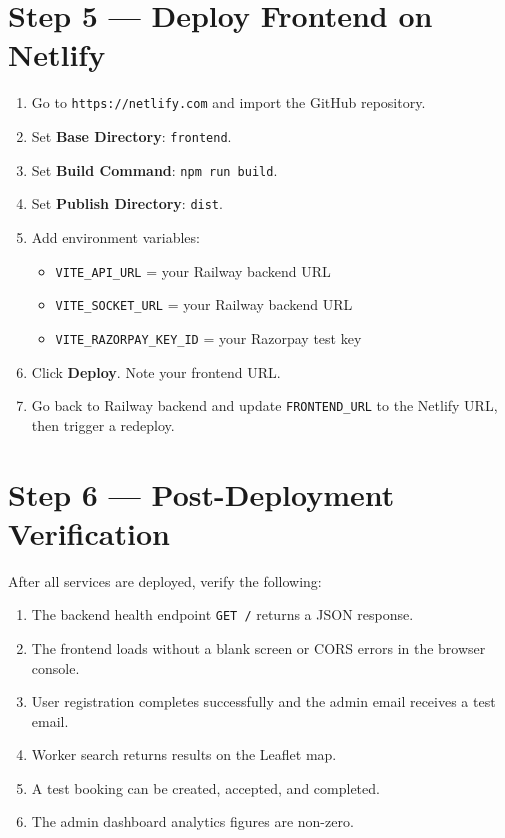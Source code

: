 \documentclass[12pt,a4paper]{report}
\begin{document}
\section{Step 5 — Deploy Frontend on Netlify}

\begin{enumerate}[leftmargin=*]
\item Go to \texttt{https://netlify.com} and import the GitHub repository.
\item Set \textbf{Base Directory}: \texttt{frontend}.
\item Set \textbf{Build Command}: \texttt{npm run build}.
\item Set \textbf{Publish Directory}: \texttt{dist}.
\item Add environment variables:
  \begin{itemize}[leftmargin=*]
  \item \texttt{VITE\_API\_URL} = your Railway backend URL
  \item \texttt{VITE\_SOCKET\_URL} = your Railway backend URL
  \item \texttt{VITE\_RAZORPAY\_KEY\_ID} = your Razorpay test key
  \end{itemize}
\item Click \textbf{Deploy}. Note your frontend URL.
\item Go back to Railway backend and update \texttt{FRONTEND\_URL} to the Netlify URL, then trigger a redeploy.
\end{enumerate}

\section{Step 6 — Post-Deployment Verification}

After all services are deployed, verify the following:
\begin{enumerate}[leftmargin=*]
\item The backend health endpoint \texttt{GET /} returns a JSON response.
\item The frontend loads without a blank screen or CORS errors in the browser console.
\item User registration completes successfully and the admin email receives a test email.
\item Worker search returns results on the Leaflet map.
\item A test booking can be created, accepted, and completed.
\item The admin dashboard analytics figures are non-zero.
\end{enumerate}
\end{document}
